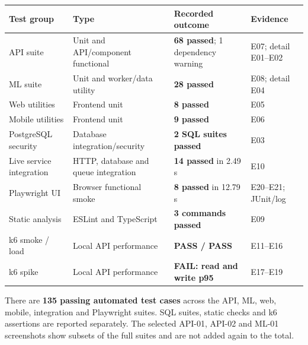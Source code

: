 \documentclass[
  11pt,
]{article}
\newcounter{none} %
\begin{document}
{\def\LTcaptype{none} %
\begin{longtable}[]{@{}
  >{\raggedright\arraybackslash}p{}
  >{\raggedright\arraybackslash}p{}
  >{\raggedright\arraybackslash}p{}
  >{\raggedright\arraybackslash}p{}@{}}
\toprule\noalign{}
\begin{minipage}[b]{\linewidth}\raggedright
Test group
\end{minipage} & \begin{minipage}[b]{\linewidth}\raggedright
Type
\end{minipage} & \begin{minipage}[b]{\linewidth}\raggedright
Recorded outcome
\end{minipage} & \begin{minipage}[b]{\linewidth}\raggedright
Evidence
\end{minipage} \\
\midrule\noalign{}
\endhead
\bottomrule\noalign{}
\endlastfoot
API suite & Unit and API/component functional & \textbf{68 passed}; 1
dependency warning & E07; detail E01--E02 \\
ML suite & Unit and worker/data utility & \textbf{28 passed} & E08;
detail E04 \\
Web utilities & Frontend unit & \textbf{8 passed} & E05 \\
Mobile utilities & Frontend unit & \textbf{9 passed} & E06 \\
PostgreSQL security & Database integration/security & \textbf{2 SQL
suites passed} & E03 \\
Live service integration & HTTP, database and queue integration &
\textbf{14 passed} in 2.49 s & E10 \\
Playwright UI & Browser functional smoke & \textbf{8 passed} in 12.79 s
& E20--E21; JUnit/log \\
Static analysis & ESLint and TypeScript & \textbf{3 commands passed} &
E09 \\
k6 smoke / load & Local API performance & \textbf{PASS / PASS} &
E11--E16 \\
k6 spike & Local API performance & \textbf{FAIL: read and write p95} &
E17--E19 \\
\end{longtable}
}

There are \textbf{135 passing automated test cases} across the API, ML,
web, mobile, integration and Playwright suites. SQL suites, static
checks and k6 assertions are reported separately. The selected API-01,
API-02 and ML-01 screenshots show subsets of the full suites and are not
added again to the total.
\end{document}
